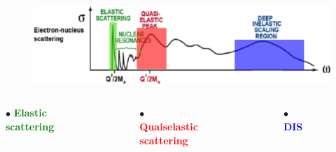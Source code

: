 \documentclass[12pt]{beamer}
\begin{document}
\begin{frame}

\begin{figure}[]
\centering
\includegraphics[width=12cm]{../images/Thesis/E_nucleus_spect_DIS.png}
\end{figure}
\begin{columns}[t]
$\bullet$ \textbf{\textcolor{green}{Elastic scattering}}
\begin{figure}[]
\includegraphics[width=3.5cm]{../images/elast_draw.png}
\end{figure}
$\bullet$ \textbf{\textcolor{red}{Quaiselastic scattering}}
\vspace{-10pt}
\begin{figure}[]
\includegraphics[width=3.5cm]{../images/quais_draw.png}
\end{figure}
$\bullet$ \textbf{\textcolor{blue}{DIS}}
\vspace{8pt}
\begin{figure}[]
\includegraphics[width=3.5cm]{../images/dis_draw.png}
\end{figure}

\end{columns}
\end{frame}
\end{document}
